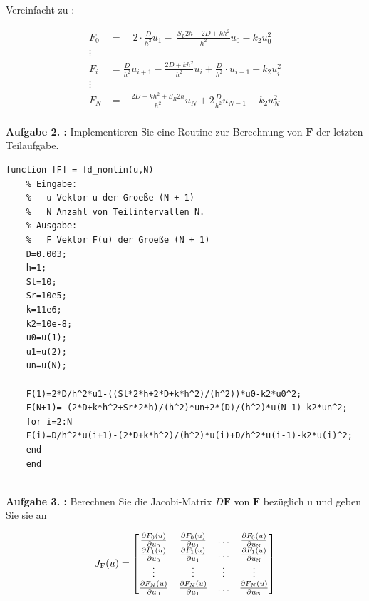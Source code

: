 \begin{qed}
	Vereinfacht zu :
	
	\begin{align*}
		F_0&= \quad 2\cdot \frac{D}{h^2}u_1-\ \frac{S_L2h+2D+kh^2}{h^2} u_0 -k_2u_0^2\\
		\vdots \\
		F_i&= 	\frac{D}{h^2}u_{i+1}-\frac{2D+kh^2}{h^2}u_i+\frac{D}{h^2}\cdot u_{i-1} -k_2u_i^2\\
		\vdots \\
		F_N &= -\frac{2D+kh^2+S_R2h}{h^2}u_N+2\frac{D}{h^2}u_{N-1}-k_2u^2_N\\
	\end{align*}
\end{qed}

\begin{mybox}
	\textbf{Aufgabe 2. :} Implementieren Sie eine Routine zur Berechnung von $\mathbf{F}$ der letzten Teilaufgabe.\cite{Prof.Dr.AndreasZeiser.April2021}
\end{mybox}

\begin{lstlisting}[style=Matlab-editor]
	function [F] = fd_nonlin(u,N)
	% Eingabe:
	%   u Vektor u der Groeße (N + 1)
	%   N Anzahl von Teilintervallen N.
	% Ausgabe:
	%   F Vektor F(u) der Groeße (N + 1) 
	D=0.003;
	h=1;
	Sl=10;
	Sr=10e5;
	k=11e6;
	k2=10e-8;
	u0=u(1);
	u1=u(2);
	un=u(N);
	
	F(1)=2*D/h^2*u1-((Sl*2*h+2*D+k*h^2)/(h^2))*u0-k2*u0^2;
	F(N+1)=-(2*D+k*h^2+Sr*2*h)/(h^2)*un+2*(D)/(h^2)*u(N-1)-k2*un^2;
	for i=2:N
	F(i)=D/h^2*u(i+1)-(2*D+k*h^2)/(h^2)*u(i)+D/h^2*u(i-1)-k2*u(i)^2;
	end
	end
	
\end{lstlisting}

\begin{mybox}
	\textbf{Aufgabe 3. :} Berechnen Sie die Jacobi-Matrix $D\mathbf{F}$ von $\mathbf{F}$ bezüglich u und geben Sie sie an
\end{mybox}
\begin{equation}
	J_\mathrm{F}(u)=
	\begin{bmatrix}
		\pdv{F_0(u)}{u_0} & \pdv{F_0(u)}{u_1} & \dots & \pdv{F_0(u)}{u_\mathrm{N}} \\
			\pdv{F_1(u)}{u_0} & \pdv{F_1(u)}{u_1} & \dots & \pdv{F_1(u)}{u_\mathrm{N}} \\
			\vdots & \vdots & \vdots & \vdots \\
			\pdv{F_N(u)}{u_0} & \pdv{F_N(u)}{u_1} & \dots & \pdv{F_N(u)}{u_\mathrm{N}}		
		
	\end{bmatrix}
\end{equation}






